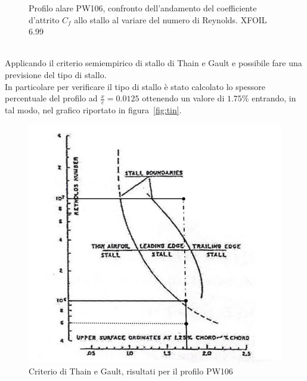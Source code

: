 \begin{figure} [H]
\centering
{}
\caption{\footnotesize Profilo alare PW106, confronto dell'andamento del coefficiente d'attrito $C_f$ allo stallo al variare del numero di Reynolds. XFOIL 6.99}
\label{fig:coef}
\end{figure}
 \noindent \\ 


Applicando il criterio semiempirico di stallo di Thain e Gault e possibile fare una previsione del tipo di stallo.\\
In particolare per verificare il tipo di stallo è stato calcolato lo spessore percentuale del profilo ad ${\frac {x}{c} }=0.0125$ ottenendo un valore di $1.75 \%$ entrando, in tal modo, nel grafico riportato in figura~\vref{fig:tin}.



\begin {figure} [H]
\centering
\includegraphics[width= 12cm ]{images/fileImg/thin.png}
\caption{\footnotesize Criterio di Thain e Gault, risultati per il profilo PW106}
\label {fig:tin}
\end {figure}

